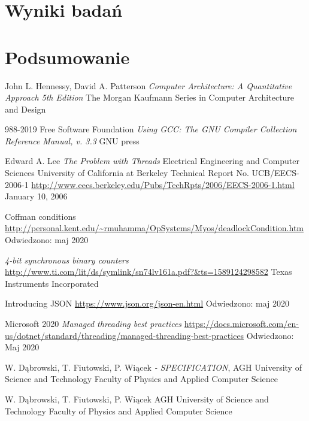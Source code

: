 \documentclass[a4paper,12pt]{article}
\begin{document}
\section{Wyniki badań}

\section{Podsumowanie}

\newpage
\begin{thebibliography}{99}

        John L. Hennessy, David A. Patterson 
        \textit{Computer Architecture: A Quantitative Approach  5th Edition }
        The Morgan Kaufmann Series in Computer Architecture and Design

        988-2019 Free Software Foundation
        \textit{Using GCC: The GNU Compiler Collection Reference Manual, v. 3.3}
        GNU press

        Edward A. Lee
        \textit{The Problem with Threads}
        Electrical Engineering and Computer Sciences
        University of California at Berkeley
        Technical Report No. UCB/EECS-2006-1
        \url{http://www.eecs.berkeley.edu/Pubs/TechRpts/2006/EECS-2006-1.html}
        January 10, 2006

        Coffman conditions
        \url{http://personal.kent.edu/~rmuhamma/OpSystems/Myos/deadlockCondition.htm}
        Odwiedzono: maj 2020

        \textit{4-bit synchronous binary counters}
        \url{http://www.ti.com/lit/ds/symlink/sn74lv161a.pdf?&ts=1589124298582}
        Texas Instruments Incorporated
        

        Introducing JSON
        \url{https://www.json.org/json-en.html}
        Odwiedzono: maj 2020

        Microsoft 2020
        \textit{Managed threading best practices}
        \url{https://docs.microsoft.com/en-us/dotnet/standard/threading/managed-threading-best-practices}
        Odwiedzono: Maj 2020
        
	W. Dąbrowski, T. Fiutowski, P. Wiącek 
	\textit{ - SPECIFICATION},
	AGH University of Science and Technology
        Faculty of Physics and Applied Computer Science 

	W. Dąbrowski, T. Fiutowski, P. Wiącek 
        \textit{}
        AGH University of Science and Technology
        Faculty of Physics and Applied Computer Science 


\end{thebibliography}
\end{document}
